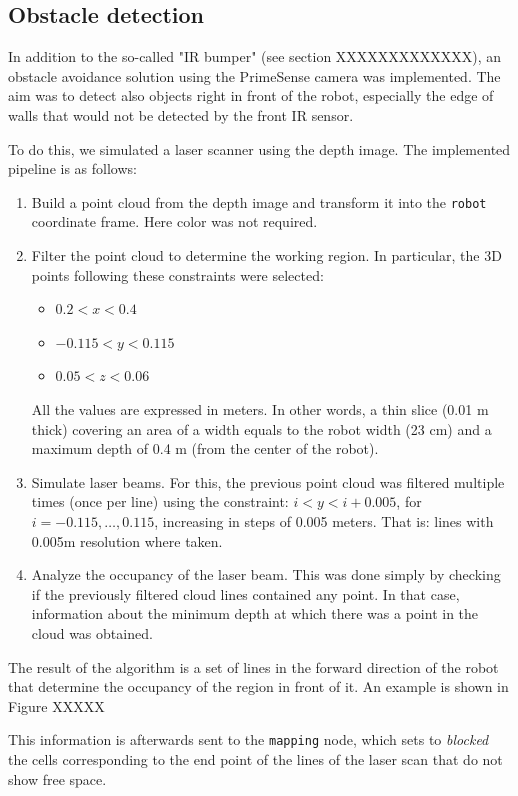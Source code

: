 \subsection{Obstacle detection}

In addition to the so-called "IR bumper" (see section XXXXXXXXXXXXX), an obstacle avoidance solution using the PrimeSense camera was implemented. The aim was to detect also objects right in front of the robot, especially the edge of walls that would not be detected by the front IR sensor.

To do this, we simulated a laser scanner using the depth image. The implemented pipeline is as follows:

\begin{enumerate}
\item Build a point cloud from the depth image and transform it into the \texttt{robot} coordinate frame. Here color was not required. 
\item Filter the point cloud to determine the working region. In particular, the 3D points following these constraints were selected:
\begin{itemize}
\item $0.2 < x < 0.4$
\item $-0.115 < y < 0.115 $
\item $0.05 < z < 0.06$
\end{itemize}

All the values are expressed in meters. In other words, a thin slice (0.01 m thick) covering an area of a width equals to the robot width (23 cm) and a maximum depth of 0.4 m (from the center of the robot).

\item Simulate laser beams. For this, the previous point cloud was filtered multiple times (once per line) using the constraint: $ i < y < i+0.005$, for $i = -0.115, \dots, 0.115$, increasing in steps of 0.005 meters. That is: lines with 0.005m resolution where taken. 
\item Analyze the occupancy of the laser beam. This was done simply by checking if the previously filtered cloud lines contained any point. In that case, information about the minimum depth at which there was a point in the cloud was obtained.
\end{enumerate}

The result of the algorithm is a set of lines in the forward direction of the robot that determine the occupancy of the region in front of it. An example is shown in Figure XXXXX

This information is afterwards sent to the \texttt{mapping} node, which sets to \emph{blocked} the cells corresponding to the end point of the lines of the laser scan that do not show free space. 
